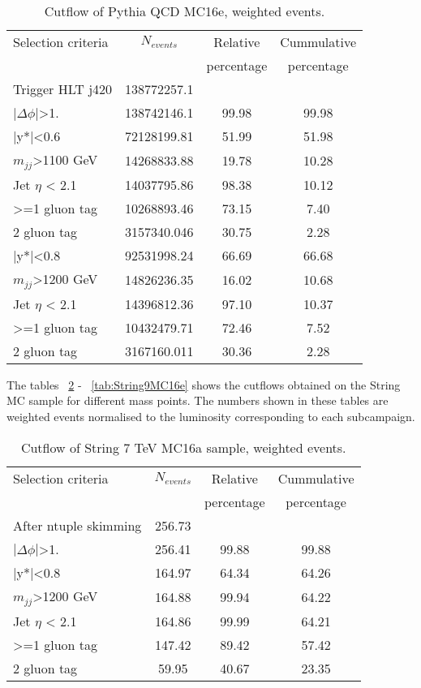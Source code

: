 \begin{table}[ht]
\begin{center}
\begin{tabular}{|l|c|c|c|}
\hline
Selection criteria & $N_{events}$ & Relative & Cummulative  \\
 & & percentage & percentage \\
\hline
Trigger HLT j420 & 138772257.1 &  &  \\
$|\Delta\phi|$>1. & 138742146.1 & 99.98 & 99.98 \\
\hline\hline
|y*|<0.6 & 72128199.81 & 51.99 & 51.98 \\
$m_{jj}$>1100 GeV & 14268833.88 & 19.78 & 10.28 \\
Jet $\eta$ < 2.1 & 14037795.86 & 98.38 & 10.12 \\
>=1 gluon tag & 10268893.46 & 73.15 & 7.40 \\
2 gluon tag & 3157340.046 & 30.75 & 2.28 \\
\hline\hline
|y*|<0.8 & 92531998.24 & 66.69 & 66.68 \\
$m_{jj}$>1200 GeV & 14826236.35 & 16.02 & 10.68 \\
Jet $\eta$ < 2.1 & 14396812.36 & 97.10 & 10.37 \\
>=1 gluon tag & 10432479.71 & 72.46 & 7.52 \\
2 gluon tag & 3167160.011 & 30.36 & 2.28 \\
\hline
\end{tabular}
\end{center}
\caption{Cutflow of Pythia QCD MC16e, weighted events.}
\label{tab:bckgdcutflowMC16eWeighted}
\end{table}

The tables ~\ref{tab:String7MC16a} -  ~\ref{tab:String9MC16e} shows the cutflows obtained on the String MC sample for different mass points. The numbers shown in these tables are weighted events normalised to the luminosity corresponding to each subcampaign. 

\begin{table}[ht]
\begin{center}
\begin{tabular}{|l|c|c|c|}
\hline
Selection criteria & $N_{events}$ & Relative & Cummulative \\
 & & percentage & percentage \\
\hline
After ntuple skimming & 256.73 &  &  \\
$|\Delta\phi|$>1. & 256.41 & 99.88 & 99.88 \\
|y*|<0.8 & 164.97 & 64.34 & 64.26 \\
$m_{jj}$>1200 GeV & 164.88 & 99.94 & 64.22 \\
Jet $\eta$ < 2.1 & 164.86 & 99.99 & 64.21 \\
>=1 gluon tag & 147.42 & 89.42 & 57.42 \\
2 gluon tag & 59.95 & 40.67 & 23.35 \\
\hline
\end{tabular}
\end{center}
\caption{Cutflow of String 7 TeV MC16a sample, weighted events.}
\label{tab:String7MC16a}
\end{table}

